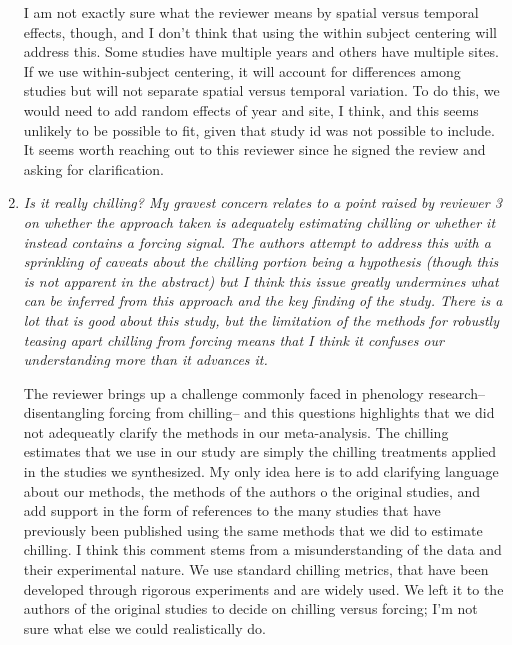 \documentclass[11pt, a4paper]{article}
\begin{document}
\begin{enumerate}
\par I am not exactly sure what the reviewer means by spatial versus temporal effects, though, and I don't think that using the within subject centering will address this. Some studies have multiple years and others have multiple sites. If we use within-subject centering, it will account for differences among studies but will not separate spatial versus temporal variation. To do this, we would need to add random effects of year and site, I think, and this seems unlikely to be possible to fit, given that study id was not possible to include. It seems worth reaching out to this reviewer since he signed the review and asking for clarification.
\item \emph{ Is it really chilling? My gravest concern relates to a point raised by reviewer 3 on whether the
approach taken is adequately estimating chilling or whether it instead contains a forcing signal.
The authors attempt to address this with a sprinkling of caveats about the chilling portion
being a hypothesis (though this is not apparent in the abstract) but I think this issue greatly
undermines what can be inferred from this approach and the key finding of the study. There is
a lot that is good about this study, but the limitation of the methods for robustly teasing apart
chilling from forcing means that I think it confuses our understanding more than it advances it.}
\par The reviewer brings up a challenge commonly faced in phenology research-- disentangling forcing from chilling-- and this questions highlights that we did not adequeatly clarify the methods in our meta-analysis. The chilling estimates that we use in our study are simply the chilling treatments applied in the studies we synthesized. My only idea here is to add clarifying language about our methods, the methods of the authors o the original studies, and add support in the form of references to the many studies that have previously been published using the same methods that we did to estimate chilling. I think this comment stems from a misunderstanding of the data and their experimental nature. We use standard chilling metrics, that have been developed through rigorous experiments and are widely used. We left it to the authors of the original studies to decide on chilling versus forcing; I'm not sure what else we could realistically do. 


\end{enumerate}
\end{document}
